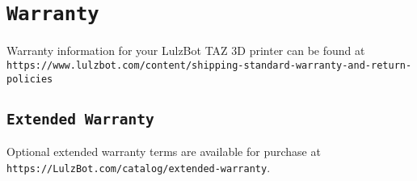 %
%
%
%
%

\section{\texttt{Warranty}}
Warranty information for your LulzBot\textsuperscript{\miniscule{\texttrademark}} TAZ 3D printer can be found at \texttt{https://www.lulzbot.com/content/shipping-standard-warranty-and-return-policies}

\subsection{\texttt{Extended Warranty}}
Optional extended warranty terms are available for purchase at \texttt{https://LulzBot.com/catalog/extended-warranty}.
